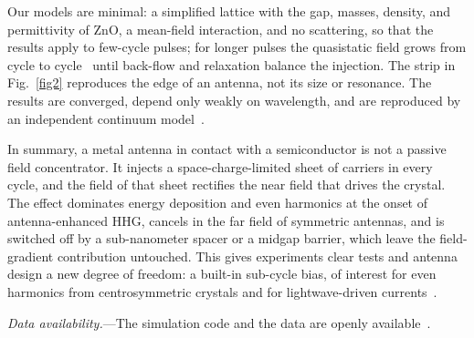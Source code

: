 \documentclass[aps,prl,twocolumn,superscriptaddress,floatfix,nolongbibliography]{revtex4-2}
\begin{document}
Our models are minimal: a simplified lattice with the gap, masses, density, and permittivity
of ZnO, a mean-field interaction, and no scattering, so that the results apply to few-cycle
pulses; for longer pulses the quasistatic
field grows from cycle to cycle~\cite{SM} until back-flow and relaxation balance the
injection. The strip in Fig.~\ref{fig2} reproduces the edge of an antenna, not its size or
resonance. The results are converged, depend only weakly on wavelength, and are reproduced by
an independent continuum model~\cite{SM}.

In summary, a metal antenna in contact with a semiconductor is not a passive field
concentrator. It injects a space-charge-limited sheet of carriers in every cycle, and the
field of that sheet rectifies the near field that drives the crystal. The effect dominates
energy deposition and even harmonics at the onset of antenna-enhanced HHG, cancels in the far
field of symmetric antennas, and is switched off by a sub-nanometer spacer or a midgap
barrier, which leave the field-gradient contribution untouched. This gives experiments clear tests and antenna design a new degree of freedom: a
built-in sub-cycle bias, of interest for even harmonics from centrosymmetric crystals and for
lightwave-driven currents~\cite{schiffrin2013}.

\begin{acknowledgments}
\end{acknowledgments}

\textit{Data availability.}---The simulation code and the data are openly
available~\cite{repo}.


\end{document}
